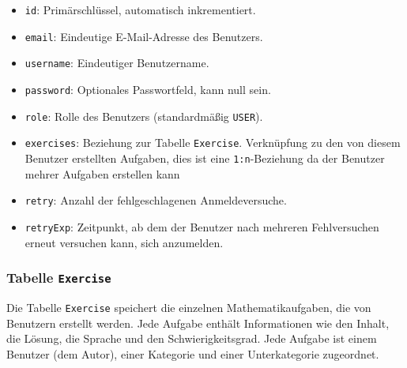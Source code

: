 \documentclass[12pt,a4paper]{article} %
\begin{document}
\begin{itemize}
  \item \texttt{id}: Primärschlüssel, automatisch inkrementiert.
  \item \texttt{email}: Eindeutige E-Mail-Adresse des Benutzers.
  \item \texttt{username}: Eindeutiger Benutzername.
  \item \texttt{password}: Optionales Passwortfeld, kann null sein.
  \item \texttt{role}: Rolle des Benutzers (standardmäßig \texttt{USER}).
  \item \texttt{exercises}: Beziehung zur Tabelle \texttt{Exercise}. Verknüpfung zu den von diesem Benutzer erstellten Aufgaben, dies ist eine \texttt{1:n}-Beziehung da der Benutzer mehrer Aufgaben erstellen kann
  \item \texttt{retry}: Anzahl der fehlgeschlagenen Anmeldeversuche.
  \item \texttt{retryExp}: Zeitpunkt, ab dem der Benutzer nach mehreren Fehlversuchen erneut versuchen kann, sich anzumelden.
\end{itemize}

\subsubsection{Tabelle \texttt{Exercise}}

Die Tabelle \texttt{Exercise} speichert die einzelnen Mathematikaufgaben, die von Benutzern erstellt werden. Jede Aufgabe enthält Informationen wie den Inhalt, die Lösung, die Sprache und den Schwierigkeitsgrad. Jede Aufgabe ist einem Benutzer (dem Autor), einer Kategorie und einer Unterkategorie zugeordnet.
\end{document}
